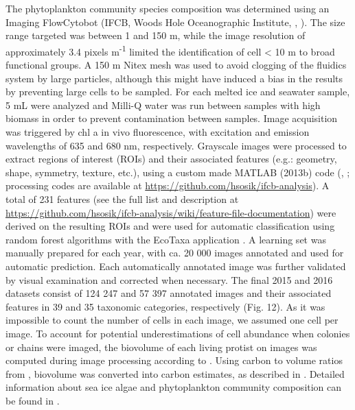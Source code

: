 \documentclass[essd, manuscript]{copernicus}
\begin{document}
The phytoplankton community species composition was determined using an Imaging FlowCytobot (IFCB, Woods Hole Oceanographic Institute, \citet{Sosik2007}, \citet{Olson2007}). The size range targeted was between 1 and 150 \textmu m, while the image resolution of approximately 3.4 pixels \textmu m\textsuperscript{-1} limited the identification of cell < 10 \textmu m to broad functional groups. A 150 \textmu m Nitex mesh was used to avoid clogging of the fluidics system by large particles, although this might have induced a bias in the results by preventing large cells to be sampled. For each melted ice and seawater sample, 5 mL were analyzed and Milli-Q water was run between samples with high biomass in order to prevent contamination between samples. Image acquisition was triggered by chl a in vivo fluorescence, with excitation and emission wavelengths of 635 and 680 nm, respectively. Grayscale images were processed to extract regions of interest (ROIs) and their associated features (e.g.: geometry, shape, symmetry, texture, etc.), using a custom made MATLAB (2013b) code (\citet{Sosik2007}, \citet{Olson2007}; processing codes are available at \url{https://github.com/hsosik/ifcb-analysis}). A total of 231 features (see the full list and description at \url{https://github.com/hsosik/ifcb-analysis/wiki/feature-file-documentation}) were derived on the resulting ROIs and were used for automatic classification using random forest algorithms with the EcoTaxa application \citep{Picheral2017}. A learning set was manually prepared for each year, with ca. 20 000 images annotated and used for automatic prediction. Each automatically annotated image was further validated by visual examination and corrected when necessary. The final 2015 and 2016 datasets consist of 124 247 and 57 397 annotated images and their associated features in 39 and 35 taxonomic categories, respectively (Fig. 12). As it was impossible to count the number of cells in each image, we assumed one cell per image. To account for potential underestimations of cell abundance when colonies or chains were imaged, the biovolume of each living protist on images was computed during image processing according to ­\citet{Moberg2012}. Using carbon to volume ratios from \citet{Menden-Deuer2000}, biovolume was converted into carbon estimates, as described in \citet{Laney2014}. Detailed information about sea ice algae and phytoplankton community composition can be found in \citet{Grondin2019}. 
\end{document}
